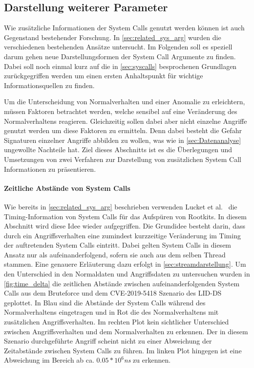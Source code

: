         \subsection{Darstellung weiterer Parameter}\label{sec:Meta}
                Wie zusätzliche Informationen der System Calls genutzt werden können ist auch Gegenstand bestehender Forschung.
                In \autoref{sec:related_sys_arg} wurden die verschiedenen bestehenden Ansätze untersucht.
                Im Folgenden soll es speziell darum gehen neue Darstellungsformen der System Call Argumente zu finden.
                Dabei soll noch einmal kurz auf die in \autoref{sec:syscalls} besprochenen Grundlagen zurückgegriffen werden um einen ersten Anhaltspunkt für wichtige Informationsquellen zu finden.

                Um die Unterscheidung von Normalverhalten und einer Anomalie zu erleichtern, müssen Faktoren betrachtet werden, welche sensibel auf eine Veränderung des Normalverhaltens reagieren.
                Gleichzeitig sollen dabei aber nicht einzelne Angriffe genutzt werden um diese Faktoren zu ermitteln.
                Denn dabei besteht die Gefahr Signaturen einzelner Angriffe abbilden zu wollen, was wie in \autoref{sec:Datenanalyse} ungewollte Nachteile hat.
                Ziel dieses Abschnitts ist es die Überlegungen und Umsetzungen von zwei Verfahren zur Darstellung von zusätzlichen System Call Informationen zu präsentieren.

                \paragraph{Zeitliche Abstände von System Calls}

                    Wie bereits in \autoref{sec:related_sys_arg} beschrieben verwenden Lucket et al.~\cite{TIMINGLUCKETT2016} die Timing-Information von System Calls für das Aufspüren von Rootkits.
                    In diesem Abschnitt wird diese Idee wieder aufgegriffen.
                    Die Grundidee besteht darin, dass durch ein Angriffsverhalten eine zumindest kurzzeitige Veränderung im Timing der auftretenden System Calls eintritt.
                    Dabei gelten System Calls in diesem Ansatz nur als aufeinanderfolgend, sofern sie auch aus dem selben Thread stammen.
                    Eine genauere Erläuterung dazu erfolgt in \autoref{sec:streamdarstellung}.
                    Um den Unterschied in den Normaldaten und Angriffsdaten zu untersuchen wurden in \autoref{fig:time_delta} die zeitlichen Abstände zwischen aufeinanderfolgenden System Calls aus dem Bruteforce und dem CVE-2019-5418 Szenario des \ac{LID-DS} geplottet.
                    In Blau sind die Abstände der System Calls während des Normalverhaltens eingetragen und in Rot die des Normalverhaltens mit zusätzlichen Angriffsverhalten.
                    Im rechten Plot kein sichtlicher Unterschied zwischen Angriffsverhalten und dem Normalverhalten zu erkennen.
                    Der in diesem Szenario durchgeführte Angriff scheint nicht zu einer Abweichung der Zeitabstände zwischen System Calls zu führen.
                    Im linken Plot hingegen ist eine Abweichung im Bereich ab ca. $0.05*10^{6}$\textit{ns} zu erkennen.

